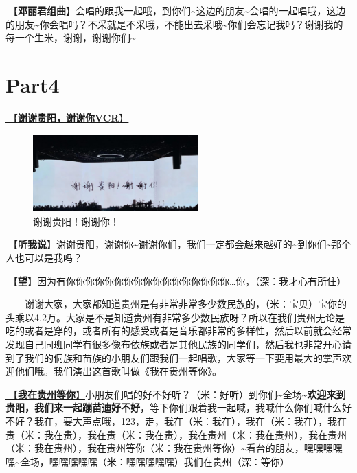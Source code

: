 \documentclass[]{ctexbook}
\begin{document}
🎵【\textbf{邓丽君组曲}】会唱的跟我一起哦，到你们\textasciitilde 这边的朋友\textasciitilde 会唱的一起唱哦，这边的朋友\textasciitilde 你会唱吗？不采就是不采哦，不能出去采哦\textasciitilde 你们会忘记我吗？谢谢我的每一个生米，谢谢，谢谢你们\textasciitilde{}

\section{Part4}\label{guiyang-20240713-part4}

\hyperref[thank-you-vcr]{🎥【\textbf{谢谢贵阳，谢谢你VCR}】}

\begin{figure}

{\centering \includegraphics[width=180pt]{img/guiyang20240713/thank-guiyang} 

}

\caption{谢谢贵阳！谢谢你！}\label{fig:unnamed-chunk-51}
\end{figure}

\hyperref[listen-to-me]{🎵【\textbf{听我说}】}谢谢贵阳，谢谢你\textasciitilde 谢谢你们，我们一定都会越来越好的\textasciitilde 到你们\textasciitilde 那个人也可以是我吗？

\hyperref[hope]{🎵【\textbf{望}】}因为有你你你你你你你你你你你你你你你你你\ldots 你，（深：我才心有所住）

  谢谢大家，大家都知道贵州是有非常非常多少数民族的，（米：宝贝）宝你的头乘以4.2万。大家是不是知道贵州有非常多少数民族呀？所以在我们贵州无论是吃的或者是穿的，或者所有的感受或者是音乐都非常的多样性，然后以前就会经常发现自己同班同学有很多像布依族或者是其他民族的同学们，然后我也非常开心请到了我们的侗族和苗族的小朋友们跟我们一起唱歌，大家等一下要用最大的掌声欢迎他们哦。我们演出这首歌叫做《我在贵州等你》。

\hyperref[waitting-in-guizhou]{🎵【\textbf{我在贵州等你}】}小朋友们唱的好不好听？（米：好听）到你们\textasciitilde 全场\textasciitilde{}\textbf{欢迎来到贵阳，我们来一起蹦苗迪好不好}，等下你们跟着我一起喊，我喊什么你们喊什么好不好？我在，要大声点哦，123，走，我在（米：我在），我在（米：我在），我在贵（米：我在贵），我在贵（米：我在贵），我在贵州（米：我在贵州），我在贵州（米：我在贵州），我在贵州等你（米：我在贵州等你）\textasciitilde 看台的朋友，嘿嘿嘿嘿嘿\textasciitilde 全场，嘿嘿嘿嘿嘿（米：嘿嘿嘿嘿嘿）我们在贵州（深：等你）
\end{document}
